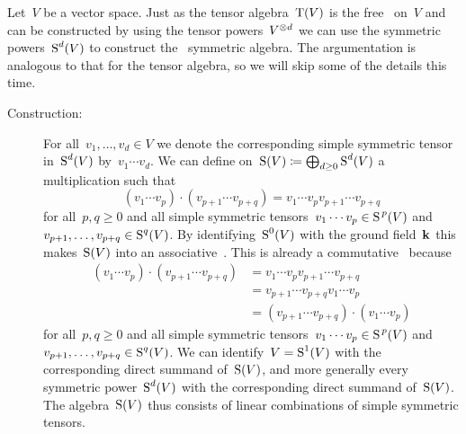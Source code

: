 \begin{recall}
  Let~$V$ be a vector space.
  Just as the tensor algebra~$\operatorname{T}(V)$ is the free~{\algebra{$\kf$}} on~$V$ and can be constructed by using the tensor powers~$V^{\otimes d}$ we can use the symmetric powers~$\operatorname{S}^d(V)$ to construct the ~\gls*{symmetric algebra}.
  The argumentation is analogous to that for the tensor algebra, so we will skip some of the details this time.
  
  \begin{description}
    \item[Construction:]
      For all~$v_1, \dotsc, v_d \in V$ we denote the corresponding simple symmetric tensor in~$\operatorname{S}^d(V)$ by~$v_1 \dotsm v_d$.
      We can define on~$\operatorname{S}(V) \coloneqq \bigoplus_{d \geq 0} \operatorname{S}^d(V)$ a multiplication such that
      \[
        (v_1 \dotsm v_p) \cdot (v_{p+1} \dotsm v_{p+q})
        =
        v_1 \dotsm v_p v_{p+1} \dotsm v_{p+q}
      \]
      for all~$p, q \geq 0$ and all simple symmetric tensors~$v_1 \dotsm v_p \in \operatorname{S}^{\, p}(V)$ and~$v_{p+1}, \dotsc, v_{p+q} \in \operatorname{S}^q(V)$.
      By identifying~$\operatorname{S}^0(V)$ with the ground field~$\kf$ this makes~$\operatorname{S}(V)$ into an associative~{\algebra{$\kf$}}.
      This is already a commutative~{\algebra{$\kf$}} because
      \begin{align*}
        (v_1 \dotsm v_p) \cdot (v_{p+1} \dotsm v_{p+q})
        &=
        v_1 \dotsm v_p v_{p+1} \dotsm v_{p+q}
        \\
        &=
        v_{p+1} \dotsm v_{p+q} v_1 \dotsm v_p
        \\
        &=
        (v_{p+1} \dotsm v_{p+q}) \cdot (v_1 \dotsm v_p)
      \end{align*}
      for all~$p, q \geq 0$ and all simple symmetric tensors~$v_1 \dotsm v_p \in \operatorname{S}^{\, p}(V)$ and~$v_{p+1}, \dotsc, v_{p+q} \in \operatorname{S}^q(V)$. 
      We can identify~$V = \operatorname{S}^1(V)$ with the corresponding direct summand of~$\operatorname{S}(V)$, and more generally every symmetric power~$\operatorname{S}^d(V)$ with the corresponding direct summand of~$\operatorname{S}(V)$.
      The algebra~$\operatorname{S}(V)$ thus consists of linear combinations of simple symmetric tensors.
      

\end{description}
\end{recall}
